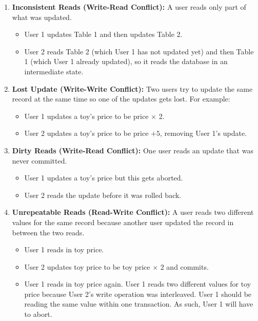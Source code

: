 \documentclass{article}
\begin{document}
\begin{enumerate}
    \item \textbf{Inconsistent Reads (Write-Read Conflict):} A user reads only part of what was updated.
    \begin{itemize}
        \item User 1 updates Table 1 and then updates Table 2.
        \item User 2 reads Table 2 (which User 1 has not updated yet) and then Table 1 (which User 1 already updated), so it reads the database in an intermediate state.
    \end{itemize}

    \item \textbf{Lost Update (Write-Write Conflict):} Two users try to update the same record at the same time so one of the updates gets lost. For example:
    \begin{itemize}
        \item User 1 updates a toy's price to be price $\times$ 2.
        \item User 2 updates a toy's price to be price $+ 5$, removing User 1's update.
    \end{itemize}

    \item \textbf{Dirty Reads (Write-Read Conflict):} One user reads an update that was never committed.
    \begin{itemize}
        \item User 1 updates a toy's price but this gets aborted.
        \item User 2 reads the update before it was rolled back.
    \end{itemize}

    \item \textbf{Unrepeatable Reads (Read-Write Conflict):} A user reads two different values for the same record because another user updated the record in between the two reads.
    \begin{itemize}
        \item User 1 reads in toy price.
        \item User 2 updates toy price to be toy price $\times$ 2 and commits.
        \item User 1 reads in toy price again. User 1 reads two different values for toy price because User 2's write operation was interleaved. User 1 should be reading the same value within one transaction. As such, User 1 will have to abort.
    \end{itemize}
\end{enumerate}
\end{document}
